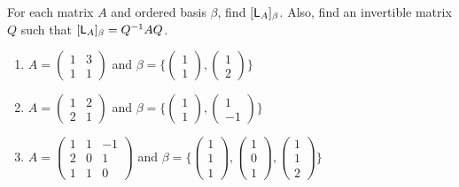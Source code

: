\begin{exercise} \label{exercise 2.5.6}
For each matrix \(A\) and ordered basis \(\beta\), find \([\textsf{L}_A]_{\beta}\).
Also, find an invertible matrix \(Q\) such that \([\textsf{L}_A]_{\beta} = Q^{-1} A Q\).

\begin{enumerate}
\item \(A = \begin{pmatrix} 1 & 3 \\ 1 & 1 \end{pmatrix}\) and \(\beta = \bigg\{
    \begin{pmatrix} 1 \\ 1 \end{pmatrix},
    \begin{pmatrix} 1 \\ 2 \end{pmatrix}
\bigg\}\)

\item \(A = \begin{pmatrix} 1 & 2 \\ 2 & 1 \end{pmatrix}\) and \(\beta = \bigg\{
    \begin{pmatrix} 1 \\ 1 \end{pmatrix},
    \begin{pmatrix} 1 \\ -1 \end{pmatrix}
\bigg\}\)

\item \(A = \begin{pmatrix} 1 & 1 & -1 \\ 2 & 0 & 1 \\ 1 & 1 & 0 \end{pmatrix}\) and \(\beta = \bigg\{
    \begin{pmatrix} 1 \\ 1 \\ 1 \end{pmatrix},
    \begin{pmatrix} 1 \\ 0 \\ 1 \end{pmatrix},
    \begin{pmatrix} 1 \\ 1 \\ 2 \end{pmatrix}
\bigg\}\)


\end{enumerate}
\end{exercise}
